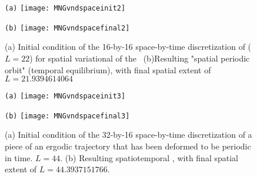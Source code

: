 \begin{description}
\begin{figure}[ht]
\begin{minipage}[height=.32\textheight]{.45\textwidth}
\centering \small{\texttt{(a)}}
\texttt{[image: MNGvndspaceinit2]}
\end{minipage}
\begin{minipage}[height=.32\textheight]{.45\textwidth}
\centering \small{\texttt{(b)}}
\texttt{[image: MNGvndspacefinal2]}
\end{minipage}
\caption{ \label{fig:MNGvndspace2}
(a) Initial condition of the 16-by-16 space-by-time discretization of  ($L=22$) for spatial
variational {\descent} of the \KSe\ (b)Resulting "spatial periodic orbit" (temporal equilibrium), with
final spatial extent of $L = 21.9394614064$
}
\end{figure}
\begin{figure}[ht]
\begin{minipage}[height=.32\textheight]{.45\textwidth}
\centering \small{\texttt{(a)}}
\texttt{[image: MNGvndspaceinit3]}
\end{minipage}
\begin{minipage}[height=.32\textheight]{.45\textwidth}
\centering \small{\texttt{(b)}}
\texttt{[image: MNGvndspacefinal3]}
\end{minipage}
\caption{ \label{fig:MNGvndspace3}
(a) Initial condition of the 32-by-16 space-by-time discretization of a piece
of an ergodic trajectory that has been deformed to be periodic in time. $L=44$.
(b) Resulting spatiotemporal \po, with
final spatial extent of $L = 44.3937151766$.
}
\end{figure}

\end{description}
